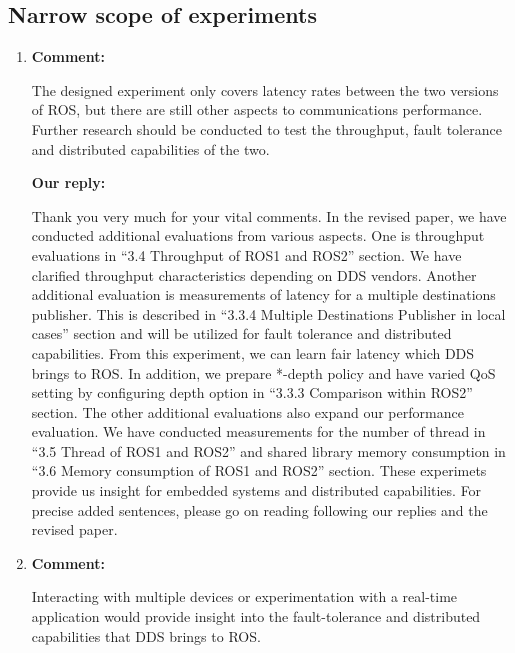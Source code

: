 \documentclass{article}
\begin{document}
\subsection{Narrow scope of experiments}
\begin{enumerate}

\item \begin{flushleft}
  \textbf{Comment:}
\end{flushleft}
  The designed experiment only covers latency rates between the two versions of ROS, but there are still other aspects to communications performance. Further research should be conducted to test the throughput, fault tolerance and distributed capabilities of the two.
  
  \begin{flushleft}
    \textbf{Our reply:}
  \end{flushleft}
  Thank you very much for your vital comments.
  In the revised paper, we have conducted additional evaluations from various aspects.
  One is throughput evaluations in ``3.4 Throughput of ROS1 and ROS2'' section.
  We have clarified throughput characteristics depending on DDS vendors.
  Another additional evaluation is measurements of latency for a multiple destinations publisher.
  This is described in ``3.3.4 Multiple Destinations Publisher in local cases'' section and will be utilized for fault tolerance and distributed capabilities.
  From this experiment, we can learn fair latency which DDS brings to ROS.
  In addition, we prepare *-depth policy and have varied QoS setting by configuring depth option in ``3.3.3 Comparison within ROS2'' section.
  The other additional evaluations also expand our performance evaluation.
  We have conducted measurements for the number of thread in ``3.5 Thread of ROS1 and ROS2'' and shared library memory consumption in ``3.6 Memory consumption of ROS1 and ROS2'' section.
  These experimets provide us insight for embedded systems and distributed capabilities.
  For precise added sentences, please go on reading following our replies and the revised paper.
  
\item \begin{flushleft}
  \textbf{Comment:}
\end{flushleft}
  Interacting with multiple devices or experimentation with a real-time application would provide insight into the fault-tolerance and distributed capabilities that DDS brings to ROS.
  

\end{enumerate}
\end{document}
